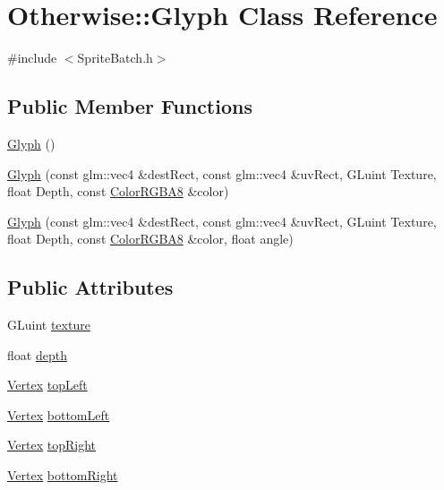 \hypertarget{class_otherwise_1_1_glyph}{}\section{Otherwise\+:\+:Glyph Class Reference}
\label{class_otherwise_1_1_glyph}


{\ttfamily \#include $<$Sprite\+Batch.\+h$>$}

\subsection*{Public Member Functions}
\begin{DoxyCompactItemize}
\item 
\hyperlink{class_otherwise_1_1_glyph_a804dc361bec171ee7e8843a6b1e3c008}{Glyph} ()
\item 
\hyperlink{class_otherwise_1_1_glyph_a1ffec3de1654e7bc69ee7badfec8fdbd}{Glyph} (const glm\+::vec4 \&dest\+Rect, const glm\+::vec4 \&uv\+Rect, G\+Luint Texture, float Depth, const \hyperlink{struct_otherwise_1_1_color_r_g_b_a8}{Color\+R\+G\+B\+A8} \&color)
\item 
\hyperlink{class_otherwise_1_1_glyph_a510e44844c26d0617588c715c240b1d0}{Glyph} (const glm\+::vec4 \&dest\+Rect, const glm\+::vec4 \&uv\+Rect, G\+Luint Texture, float Depth, const \hyperlink{struct_otherwise_1_1_color_r_g_b_a8}{Color\+R\+G\+B\+A8} \&color, float angle)
\end{DoxyCompactItemize}
\subsection*{Public Attributes}
\begin{DoxyCompactItemize}
\item 
G\+Luint \hyperlink{class_otherwise_1_1_glyph_a9d17c08c37db5c63599a28b80396d808}{texture}
\item 
float \hyperlink{class_otherwise_1_1_glyph_a0c14d4d22d5f14f9e97baf7cb4cca50e}{depth}
\item 
\hyperlink{struct_otherwise_1_1_vertex}{Vertex} \hyperlink{class_otherwise_1_1_glyph_aefe37835cd288d4f867bbfd3fddfddef}{top\+Left}
\item 
\hyperlink{struct_otherwise_1_1_vertex}{Vertex} \hyperlink{class_otherwise_1_1_glyph_a32db963ff65bdbc764a322f729cc485f}{bottom\+Left}
\item 
\hyperlink{struct_otherwise_1_1_vertex}{Vertex} \hyperlink{class_otherwise_1_1_glyph_a77f5d16d67d30c9d48e44f3f9e4eefc8}{top\+Right}
\item 
\hyperlink{struct_otherwise_1_1_vertex}{Vertex} \hyperlink{class_otherwise_1_1_glyph_ac888e1a0cb784378155ca98277a75802}{bottom\+Right}
\end{DoxyCompactItemize}
